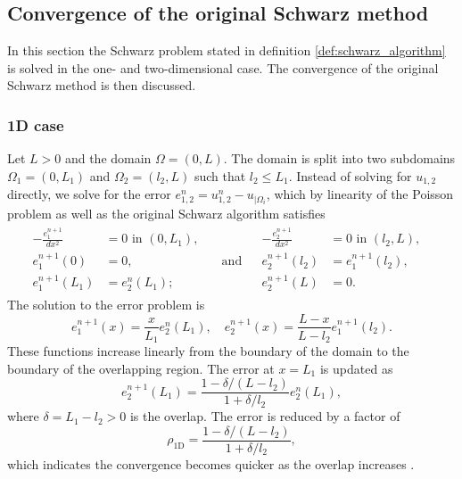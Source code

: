 \subsection{Convergence of the original Schwarz method} \label{sec:schwarz_convergence}
In this section the Schwarz problem stated in definition \ref{def:schwarz_algorithm} is solved in the one- and two-dimensional case. The convergence of the original Schwarz method is then discussed.

\subsubsection{1D case}
Let $L>0$ and the domain $\Omega = (0,L)$. The domain is split into two subdomains $\Omega_1 = (0,L_1)$ and $\Omega_2 = (l_2,L)$ such that $l_2\leq L_1$. Instead of solving for $u_{1,2}$ directly, we solve for the error $e^n_{1,2} = u^{n}_{1,2} - u_{|\Omega_i}$, which by linearity of the Poisson problem as well as the original Schwarz algorithm satisfies
\[
  \begin{array}{cc}
    \begin{aligned}
      -\frac{e_1^{n+1}}{d x^2} & = 0           \text { in } (0,L_1), &                  \\
      e_1^{n+1}(0)             & = 0,                                & \quad \text{and} \\
      e_1^{n+1}(L_1)           & = e_2^n(L_1);                       &
    \end{aligned} &
    \begin{aligned}
      -\frac{e_2^{n+1}}{d x^2} & = 0                \text { in } (l_2, L), & \\
      e_2^{n+1}(l_2)           & = e_1^{n+1}(l_2),                         & \\
      e_2^{n+1}(L)             & = 0.                                      &
    \end{aligned}
  \end{array}
\]
The solution to the error problem is
\[
  e_1^{n+1}(x) = \frac{x}{L_1}e_2^n(L_1), \quad e_2^{n+1}(x) = \frac{L-x}{L - l_2}e_1^{n+1}(l_2).
\]
These functions increase linearly from the boundary of the domain to the boundary of the overlapping region. The error at $x = L_1$ is updated as
\[
  e_2^{n+1}(L_1) = \frac{1 - \delta/(L-l_2)}{1 + \delta/l_2} e_2^n(L_1),
\]
where $\delta = L_1 - l_2 > 0 $ is the overlap. The error is reduced by a factor of
\begin{equation}
  \rho_{\text{1D}} = \frac{1 - \delta/(L-l_2)}{1 + \delta/l_2},
  \label{eq:1D_Schwarz_convergence}
\end{equation}
which indicates the convergence becomes quicker as the overlap increases \cite[Section 1.5.1]{schwarz_methods_Dolean_2015}.


